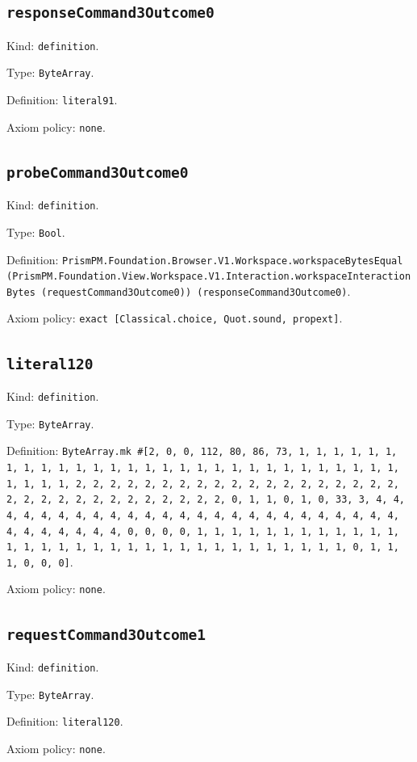 \documentclass[11pt]{article}
\begin{document}
\subsection*{\texttt{responseCommand3Outcome0}}
\noindent Kind: \texttt{definition}.\par
\noindent Type: \texttt{ByteArray}.\par
\noindent Definition: \texttt{literal91}.\par
\noindent Axiom policy: \texttt{none}.\par
\subsection*{\texttt{probeCommand3Outcome0}}
\noindent Kind: \texttt{definition}.\par
\noindent Type: \texttt{Bool}.\par
\noindent Definition: \texttt{PrismPM.Foundation.Browser.V1.Workspace.workspaceBytesEqual (PrismPM.Foundation.View.Workspace.V1.Interaction.workspaceInteractionBytes (requestCommand3Outcome0)) (responseCommand3Outcome0)}.\par
\noindent Axiom policy: \texttt{exact [Classical.choice, Quot.sound, propext]}.\par
\subsection*{\texttt{literal120}}
\noindent Kind: \texttt{definition}.\par
\noindent Type: \texttt{ByteArray}.\par
\noindent Definition: \texttt{ByteArray.mk \#[2, 0, 0, 112, 80, 86, 73, 1, 1, 1, 1, 1, 1, 1, 1, 1, 1, 1, 1, 1, 1, 1, 1, 1, 1, 1, 1, 1, 1, 1, 1, 1, 1, 1, 1, 1, 1, 1, 1, 1, 2, 2, 2, 2, 2, 2, 2, 2, 2, 2, 2, 2, 2, 2, 2, 2, 2, 2, 2, 2, 2, 2, 2, 2, 2, 2, 2, 2, 2, 2, 2, 2, 0, 1, 1, 0, 1, 0, 33, 3, 4, 4, 4, 4, 4, 4, 4, 4, 4, 4, 4, 4, 4, 4, 4, 4, 4, 4, 4, 4, 4, 4, 4, 4, 4, 4, 4, 4, 4, 4, 4, 4, 0, 0, 0, 0, 1, 1, 1, 1, 1, 1, 1, 1, 1, 1, 1, 1, 1, 1, 1, 1, 1, 1, 1, 1, 1, 1, 1, 1, 1, 1, 1, 1, 1, 1, 1, 1, 0, 1, 1, 1, 0, 0, 0]}.\par
\noindent Axiom policy: \texttt{none}.\par
\subsection*{\texttt{requestCommand3Outcome1}}
\noindent Kind: \texttt{definition}.\par
\noindent Type: \texttt{ByteArray}.\par
\noindent Definition: \texttt{literal120}.\par
\noindent Axiom policy: \texttt{none}.\par
\end{document}
